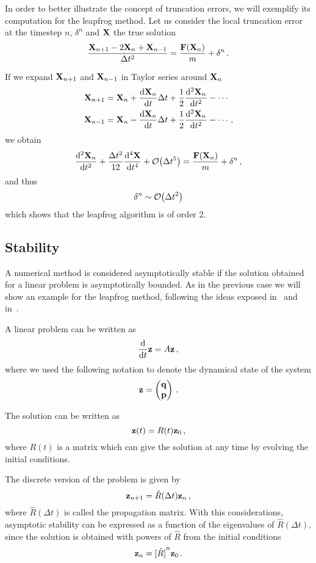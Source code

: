 \documentclass[12pt, class=report, crop=false]{standalone}
\begin{document}
In order to better illustrate the concept of truncation errors, we will exemplify
its computation for the leapfrog method. Let us consider the local truncation
error at the timestep \(n\), \(\delta^n\) and \(\vb{X}\) the true solution
\[
  \frac{\vb{X}_{n+1}-2\vb{X}_n+\vb{X}_{n-1}}{\Delta t^2} = \frac{\vb{F}(\vb{X}_n)}{m} + \delta^n\,.
\]

If we expand \(\vb{X}_{n+1}\) and \(\vb{X}_{n-1}\) in Taylor series around \(\vb{X}_n\)
\begin{align*}
  \vb{X}_{n+1} &= \vb{X}_n + \dv{\vb{X}_n}{t}\Delta t + \frac{1}{2} \dv[2]{\vb{X}_n}{t} - \dotsb \\
  \vb{X}_{n-1} &= \vb{X}_n - \dv{\vb{X}_n}{t}\Delta t + \frac{1}{2} \dv[2]{\vb{X}_n}{t} - \dotsb\,,
\end{align*}
we obtain
\[
  \dv[2]{\vb{X}_n}{t} + \frac{\Delta t^2}{12} \dv[4]{\vb{X}}{t} + \order{\Delta t^5}
  = \frac{\vb{F}(\vb{X}_n)}{m} + \delta^n\,,
\]
and thus
\[
  \delta^n \sim \order{\Delta t^2}
\]
which shows that the leapfrog algorithm is of order 2.

\subsection{Stability}

A numerical method is considered asymptotically stable if the solution obtained
for a linear problem is asymptotically bounded.
As in the previous case we will show an example for the leapfrog method,
following the ideas exposed in~\cite{butcher_numericalmethods_2016}
and in~\textcite[Section 2.6]{leimkuhler_simulatinghamiltonian_2004}.

A linear problem can be written as
\[
\dv{t} \vb{z} = A \vb{z}\,,
\]
where we used the following notation to denote the dynamical state of the system
\[
\vb{z} =
\begin{pmatrix}
  \vb{q} \\
  \vb{p}
\end{pmatrix}\,.
\]

The solution can be written as
\begin{equation*}
  \vb{z}(t) = R(t) \vb{z}_0\,,
\end{equation*}
where \(R(t)\) is a matrix which can give the solution at any time by evolving
the initial conditions.

The discrete version of the problem is given by
\begin{equation}
  \label{eq:discrete-linear-problem}
  \vb{z}_{n+1} = \hat{R}(\Delta t) \vb{z}_n\,,
\end{equation}
where \(\hat{R}(\Delta t)\) is called the propagation matrix.
With this considerations, asymptotic stability can be expressed as a function
of the eigenvalues of \(\hat{R}(\Delta t)\), since the solution is obtained
with powers of \(\hat{R}\) from the initial conditions
\begin{equation*}
  \vb{z}_n = {[\hat{R}]}^n \vb{z}_0\,.
\end{equation*}
\end{document}
